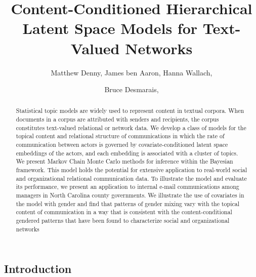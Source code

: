 \documentclass{pnastwo}
\begin{document}
\title{Content-Conditioned Hierarchical Latent Space Models for Text-Valued Networks}

\author{
Matthew Denny,
James ben Aaron,
Hanna Wallach,
\and Bruce Desmarais,
}

\contributor{\vspace{-.25cm}}


\maketitle

\begin{article}
\begin{abstract}
{Statistical topic models are widely used to represent content in textual corpora. When documents in a corpus are attributed with senders and recipients, the corpus constitutes text-valued relational or network data. We develop a class of models for the topical content and relational structure of communications in which the rate of communication between actors is governed by covariate-conditioned latent space embeddings of the actors, and each embedding is associated with a cluster of topics. We present Markov Chain Monte Carlo methods for inference within the Bayesian framework. This model holds the potential for extensive application to real-world social and organizational relational communication data. To illustrate the model and evaluate its performance, we present an application to internal e-mail communications among managers in North Carolina county governments. We illustrate the use of covariates in the model with gender and find that patterns of gender mixing vary with the topical content of communication in a way that is consistent with the content-conditional gendered patterns that have been found to characterize social and organizational networks}
\end{abstract} 



\section{Introduction}






\end{article}
\end{document}

